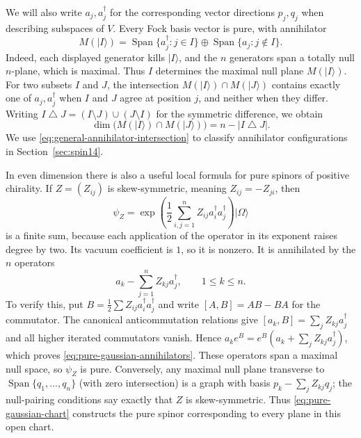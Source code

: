 \documentclass{article}
\theoremstyle{definition}
\theoremstyle{remark}
\newcommand{\vac}{|\Omega\rangle}
\newcommand{\Span}{\operatorname{Span}}
\newcommand{\ket}[1]{\lvert #1\rangle}
\newcommand{\symdiff}{\mathbin{\triangle}}
\begin{document}
We will also write $a_j,a_j^\dagger$ for the corresponding vector
directions $p_j,q_j$ when describing subspaces of $V$. Every Fock basis
vector is pure, with annihilator
\begin{equation}
 M(\ket I)
 =\Span\{a_j^\dagger:j\in I\}
  \oplus\Span\{a_j:j\notin I\}.
 \label{eq:fock-annihilator}
\end{equation}
Indeed, each displayed generator kills $\ket I$, and the $n$ generators
span a totally null $n$-plane, which is maximal.  Thus $I$ determines the maximal null plane $M(\ket I)$.  For two subsets
$I$ and $J$, the intersection $M(\ket I)\cap M(\ket J)$ contains exactly
one of $a_j,a_j^\dagger$ when $I$ and $J$ agree at position $j$, and
neither when they differ. Writing
$I\symdiff J=(I\setminus J)\cup(J\setminus I)$ for the symmetric
difference, we obtain
\begin{equation}
 \dim\bigl(M(\ket I)\cap M(\ket J)\bigr)
 =n-|I\symdiff J|.
 \label{eq:general-annihilator-intersection}
\end{equation}
We use \eqref{eq:general-annihilator-intersection} to classify
annihilator configurations in Section~\ref{sec:spin14}.

In even dimension there is also a useful local formula for pure spinors
of positive chirality. If
$Z=(Z_{ij})$ is skew-symmetric, meaning $Z_{ij}=-Z_{ji}$, then
\begin{equation}
 \psi_Z=
 \exp\left(\frac12\sum_{i,j=1}^n
 Z_{ij}a_i^\dagger a_j^\dagger\right)\vac
 \label{eq:pure-gaussian-chart}
\end{equation}
is a finite sum, because each application of the operator in its exponent raises degree
by two. Its vacuum coefficient is $1$, so it is nonzero. It is
annihilated by the $n$ operators
\begin{equation}
 a_k-\sum_{j=1}^nZ_{kj}a_j^\dagger,
 \qquad 1\leq k\leq n.
 \label{eq:pure-gaussian-annihilators}
\end{equation}
To verify this, put
$B=\frac12\sum Z_{ij}a_i^\dagger a_j^\dagger$ and write
$[A,B]=AB-BA$ for the commutator. The canonical
anticommutation relations give
$[a_k,B]=\sum_jZ_{kj}a_j^\dagger$ and all higher iterated commutators
vanish.  Hence
$a_ke^B=e^B(a_k+\sum_jZ_{kj}a_j^\dagger)$, which proves
\eqref{eq:pure-gaussian-annihilators}.  These operators span a maximal null
space, so $\psi_Z$ is pure. Conversely, any maximal null plane
transverse to $\Span\{q_1,\ldots,q_n\}$ (with zero intersection) is a graph with basis
$p_k-\sum_jZ_{kj}q_j$; the null-pairing conditions say exactly that $Z$
is skew-symmetric. Thus \eqref{eq:pure-gaussian-chart} constructs the pure
spinor corresponding to every plane in this open chart.
\end{document}
